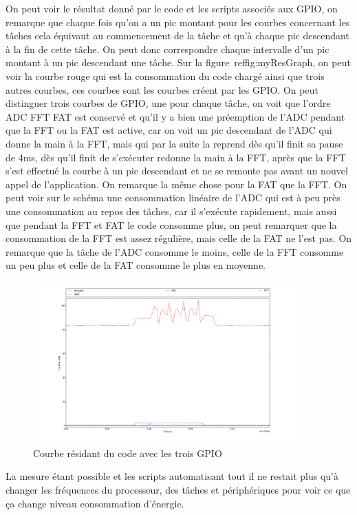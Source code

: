 \documentclass[a4paper]{article}
\begin{document}
On peut voir le résultat donné par le code et les scripts associés aux GPIO, on remarque que chaque fois qu'on a un pic montant pour les courbes concernant les tâches cela équivaut au commencement de la tâche et qu'à chaque pic descendant à la fin de cette tâche. On peut donc correspondre chaque intervalle d'un pic montant à un pic descendant une tâche. Sur la figure~ref{fig:myResGraph}, on peut voir la courbe rouge qui est la consommation du code chargé ainsi que trois autres courbes, ces courbes sont les courbes créent par les GPIO. On peut distinguer trois courbes de GPIO, une pour chaque tâche, on voit que l'ordre ADC FFT FAT est conservé et qu'il y a bien une préemption de l'ADC pendant que la FFT ou la FAT est active, car on voit un pic descendant de l'ADC qui donne la main à la FFT, mais qui par la suite la reprend dès qu'il finit sa pause de 4ms, dès qu'il finit de s'exécuter redonne la main à la FFT, après que la FFT s'est effectué la courbe à un pic descendant et ne se remonte pas avant un nouvel appel de l'application. On remarque la même chose pour la FAT que la FFT. On peut voir sur le schéma une consommation linéaire de l'ADC qui est à peu près une consommation au repos des tâches, car il s'exécute rapidement, mais aussi que pendant la FFT et FAT le code consomme plus, on peut remarquer que la consommation de la FFT est assez régulière, mais celle de la FAT ne l'est pas. On remarque que la tâche de l'ADC consomme le moins, celle de la FFT consomme un peu plus et celle de la FAT consomme le plus en moyenne.

\begin{figure}[H]
\centering
\includegraphics[width=0.9\textwidth]{resultat_2.png}
\caption{\label{fig:myResGraph} Courbe résidant du code avec les trois GPIO}
\end{figure}

La mesure étant possible et les scripts automatisant tout il ne restait plus qu'à changer les fréquences du processeur, des tâches et périphériques pour voir ce que ça change niveau consommation d'énergie. 
\end{document}
